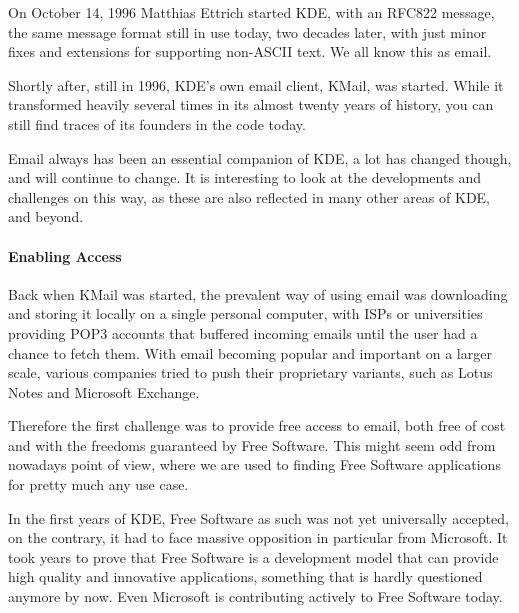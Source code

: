 

On October 14, 1996 Matthias Ettrich started KDE, with an RFC822 message, the same message format still in use today, two decades later, with just minor fixes and extensions for supporting non-ASCII text. We all know this as email.

Shortly after, still in 1996, KDE's own email client, KMail, was started. While it transformed heavily several times in its almost twenty years of history, you can still find traces of its founders in the code today.

Email always has been an essential companion of KDE, a lot has changed though, and will continue to change. It is interesting to look at the developments and challenges on this way, as these are also reflected in many other areas of KDE, and beyond.

\paragraph{Enabling Access}

Back when KMail was started, the prevalent way of using email was downloading and storing it locally on a single personal computer, with ISPs or universities providing POP3 accounts that buffered incoming emails until the user had a chance to fetch them. With email becoming popular and important on a larger scale, various companies tried to push their proprietary variants, such as Lotus Notes and Microsoft Exchange.

Therefore the first challenge was to provide free access to email, both free of cost and with the freedoms guaranteed by Free Software. This might seem odd from nowadays point of view, where we are used to finding Free Software applications for pretty much any use case.

In the first years of KDE, Free Software as such was not yet universally accepted, on the contrary, it had to face massive opposition in particular from Microsoft. It took years to prove that Free Software is a development model that can provide high quality and innovative applications, something that is hardly questioned anymore by now. Even Microsoft is contributing actively to Free Software today.

